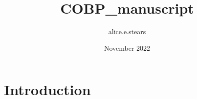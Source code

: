 \documentclass{article}
\title{COBP_manuscript}
\author{alice.e.stears }
\date{November 2022}
\begin{document}
\maketitle

\section{Introduction}
\end{document}
